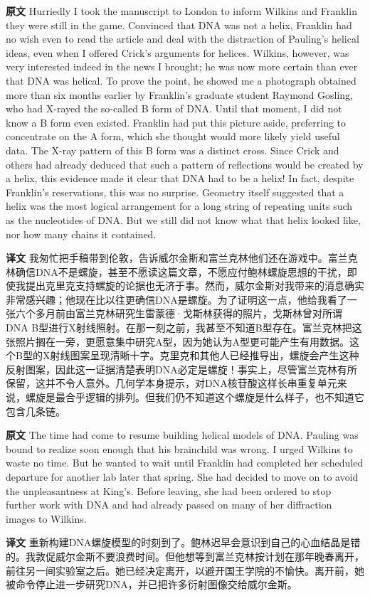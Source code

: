 \documentclass[UTF8,zihao=-4]{ctexart}
\newcommand{\BodyFont}{\fontsize{10.5pt}{15.5pt}\selectfont}
\renewenvironment{quote}{\par\noindent\begingroup\BodyFont}{\par\endgroup}
\begin{document}
\begin{quote}
\noindent\textbf{原文} Hurriedly I took the manuscript to London to inform Wilkins and Franklin they were still in the game. Convinced that DNA was not a helix, Franklin had no wish even to read the article and deal with the distraction of Pauling's helical ideas, even when I offered Crick's arguments for helices. Wilkins, however, was very interested indeed in the news I brought; he was now more certain than ever that DNA was helical. To prove the point, he showed me a photograph obtained more than six months earlier by Franklin's graduate student Raymond Gosling, who had X-rayed the so-called B form of DNA. Until that moment, I did not know a B form even existed. Franklin had put this picture aside, preferring to concentrate on the A form, which she thought would more likely yield useful data. The X-ray pattern of this B form was a distinct cross. Since Crick and others had already deduced that such a pattern of reflections would be created by a helix, this evidence made it clear that DNA had to be a helix! In fact, despite Franklin's reservations, this was no surprise. Geometry itself suggested that a helix was the most logical arrangement for a long string of repeating units such as the nucleotides of DNA. But we still did not know what that helix looked like, nor how many chains it contained.

\smallskip
\noindent\textbf{译文} 我匆忙把手稿带到伦敦，告诉威尔金斯和富兰克林他们还在游戏中。富兰克林确信DNA不是螺旋，甚至不愿读这篇文章，不愿应付鲍林螺旋思想的干扰，即使我提出克里克支持螺旋的论据也无济于事。然而，威尔金斯对我带来的消息确实非常感兴趣；他现在比以往更确信DNA是螺旋。为了证明这一点，他给我看了一张六个多月前由富兰克林研究生雷蒙德·戈斯林获得的照片，戈斯林曾对所谓DNA B型进行X射线照射。在那一刻之前，我甚至不知道B型存在。富兰克林把这张照片搁在一旁，更愿意集中研究A型，因为她认为A型更可能产生有用数据。这个B型的X射线图案呈现清晰十字。克里克和其他人已经推导出，螺旋会产生这种反射图案，因此这一证据清楚表明DNA必定是螺旋！事实上，尽管富兰克林有所保留，这并不令人意外。几何学本身提示，对DNA核苷酸这样长串重复单元来说，螺旋是最合乎逻辑的排列。但我们仍不知道这个螺旋是什么样子，也不知道它包含几条链。
\end{quote}

\begin{quote}
\noindent\textbf{原文} The time had come to resume building helical models of DNA. Pauling was bound to realize soon enough that his brainchild was wrong. I urged Wilkins to waste no time. But he wanted to wait until Franklin had completed her scheduled departure for another lab later that spring. She had decided to move on to avoid the unpleasantness at King's. Before leaving, she had been ordered to stop further work with DNA and had already passed on many of her diffraction images to Wilkins.

\smallskip
\noindent\textbf{译文} 重新构建DNA螺旋模型的时刻到了。鲍林迟早会意识到自己的心血结晶是错的。我敦促威尔金斯不要浪费时间。但他想等到富兰克林按计划在那年晚春离开，前往另一间实验室之后。她已经决定离开，以避开国王学院的不愉快。离开前，她被命令停止进一步研究DNA，并已把许多衍射图像交给威尔金斯。
\end{quote}
\end{document}
